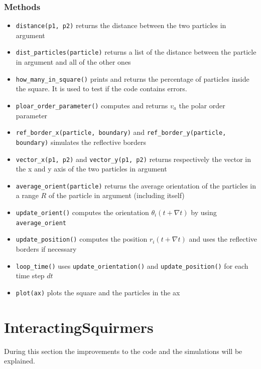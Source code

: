 \documentclass{article}
\begin{document}
\subsubsection*{Methods}
\begin{itemize}
    \item \texttt{distance(p1, p2)} returns the distance between the two particles in argument
    \item \texttt{dist\_particles(particle)} returns a list of the distance between the particle in argument and all of the other ones
    \item \texttt{how\_many\_in\_square()} prints and returns the percentage of particles inside the square. It is
    used to test if the code contains errors.
    \item \texttt{ploar\_order\_parameter()} computes and returns $v_a$ the polar order parameter
    \item \texttt{ref\_border\_x(particle, boundary)} and \texttt{ref\_border\_y(particle, boundary)}
    simulates the reflective borders
    \item \texttt{vector\_x(p1, p2)} and \texttt{vector\_y(p1, p2)} returns respectively the vector in the x and y axis of the
    two particles in argument
    \item \texttt{average\_orient(particle)} returns the average orientation of the particles in a range $R$ of the particle in argument (including itself)
    \item \texttt{update\_orient()} computes the orientation $\theta_i(t + \nabla t)$ by using \texttt{average\_orient}
    \item \texttt{update\_position()} computes the position $r_i(t + \nabla t)$ and uses the reflective borders if necessary
    \item \texttt{loop\_time()} uses \texttt{update\_orientation()} and \texttt{update\_position()} for each time step $dt$
    \item \texttt{plot(ax)} plots the square and the particles in the ax
\end{itemize}

\newpage
\section{InteractingSquirmers}
During this section the improvements to the code and the simulations will be explained.\\
\end{document}
